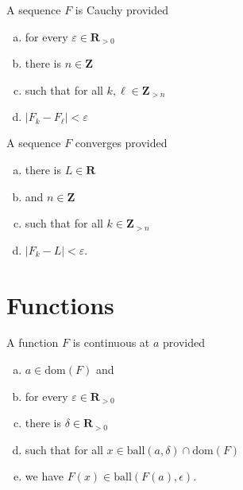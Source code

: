 \documentclass[letterpaper,landscape,9pt,fleqn]{extarticle}
\newcommand{\dom}{\mathrm{dom}}
\newcommand{\reals}{\mathbf{R}}
\newcommand{\ball}{\mathrm{ball}}
\newcommand{\integers}{\mathbf{Z}}
\newenvironment{alphalist}{
  \begin{enumerate}[(a)]
    \addtolength{\itemsep}{-1.0\itemsep}}
  {\end{enumerate}}
\begin{document}
\begin{multicols*}{3}
\begin{description}[\itemsep=0em]
\item[Cauchy] A sequence $F$ is Cauchy provided
\begin{alphalist}
    \item for every $\varepsilon \in \reals_{>0}$
    \item there is $n \in \integers$
    \item such that for all $k,\ell \in \integers_{>n}$
    \item $|F_k - F_\ell| < \varepsilon$
\end{alphalist}

\item[Converges] A sequence $F$ converges provided
\begin{alphalist}
    \item there is $L \in \reals$
    \item and $n \in \integers$
    \item such that for all $k \in \integers_{>n}$
    \item $|F_k - L | < \varepsilon$.
\end{alphalist}
\end{description}

\section*{Functions}   
\begin{description}[\itemsep=0em]
    \item[Continuous] A function $F$ is continuous at $a$ provided
    \begin{alphalist}
        \item $a \in \dom(F)$ and
        \item for every $\varepsilon \in \reals_{>0}$
        \item there is $\delta \in \reals_{>0}$
        \item such that for all $x \in \ball(a,\delta) \cap \dom(F)$
        \item we have $F(x) \in \ball(F(a), \epsilon)$.
    \end{alphalist}


\end{description}
\end{multicols*}
\end{document}
